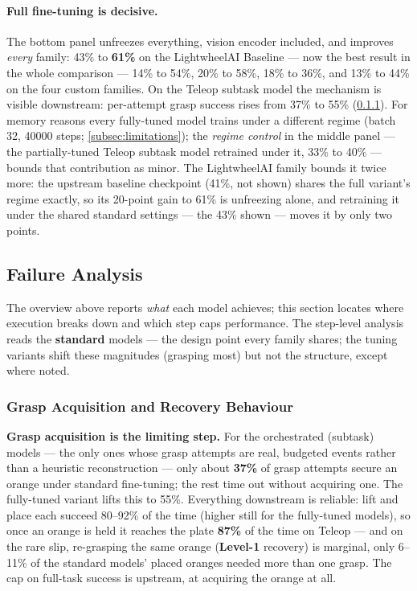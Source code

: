 \paragraph{Full fine-tuning is decisive.} The bottom panel unfreezes everything, vision encoder included, and improves \emph{every} family: 43\% to \textbf{61\%} on the LightwheelAI Baseline --- now the best result in the whole comparison --- 14\% to 54\%, 20\% to 58\%, 18\% to 36\%, and 13\% to 44\% on the four custom families. On the Teleop subtask model the mechanism is visible downstream: per-attempt grasp success rises from 37\% to 55\% (\cref{sec:failure_modes}). For memory reasons every fully-tuned model trains under a different regime (batch 32, \num{40000} steps; \cref{subsec:limitations}); the \emph{regime control} in the middle panel --- the partially-tuned Teleop subtask model retrained under it, 33\% to 40\% --- bounds that contribution as minor. The LightwheelAI family bounds it twice more: the upstream baseline checkpoint (41\%, not shown) shares the full variant's regime exactly, so its 20-point gain to 61\% is unfreezing alone, and retraining it under the shared standard settings --- the 43\% shown --- moves it by only two points.

\subsection{Failure Analysis}

The overview above reports \emph{what} each model achieves; this section locates where execution breaks down and which step caps performance. The step-level analysis reads the \textbf{standard} models --- the design point every family shares; the tuning variants shift these magnitudes (grasping most) but not the structure, except where noted.

\subsubsection{Grasp Acquisition and Recovery Behaviour}
\label{sec:failure_modes}

\textbf{Grasp acquisition is the limiting step.} For the orchestrated (subtask) models --- the only ones whose grasp attempts are real, budgeted events rather than a heuristic reconstruction --- only about \textbf{37\%} of grasp attempts secure an orange under standard fine-tuning; the rest time out without acquiring one. The fully-tuned variant lifts this to 55\%. Everything downstream is reliable: lift and place each succeed 80--92\% of the time (higher still for the fully-tuned models), so once an orange is held it reaches the plate \textbf{87\%} of the time on Teleop --- and on the rare slip, re-grasping the same orange (\textbf{Level-1} recovery) is marginal, only 6--11\% of the standard models' placed oranges needed more than one grasp. The cap on full-task success is upstream, at acquiring the orange at all.

